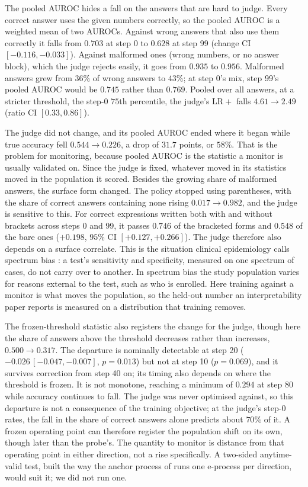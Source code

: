 \documentclass{article}
\begin{document}
The pooled AUROC hides a fall on the answers that are hard to judge. Every correct answer uses the given numbers correctly, so the pooled AUROC is a weighted mean of two AUROCs. Against wrong answers that also use them correctly it falls from $0.703$ at step 0 to $0.628$ at step 99 (change CI $[-0.116, -0.033]$). Against malformed ones (wrong numbers, or no answer block), which the judge rejects easily, it goes from $0.935$ to $0.956$. Malformed answers grew from $36\%$ of wrong answers to $43\%$; at step 0's mix, step 99's pooled AUROC would be $0.745$ rather than $0.769$. Pooled over all answers, at a stricter threshold, the step-0 $75$th percentile, the judge's $\mathrm{LR}+$ falls $4.61 \to 2.49$ (ratio CI $[0.33, 0.86]$).

The judge did not change, and its pooled AUROC ended where it began while true accuracy fell $0.544 \to 0.226$, a drop of $31.7$ points, or $58\%$. That is the problem for monitoring, because pooled AUROC is the statistic a monitor is usually validated on. Since the judge is fixed, whatever moved in its statistics moved in the population it scored. Besides the growing share of malformed answers, the surface form changed. The policy stopped using parentheses, with the share of correct answers containing none rising $0.017 \to 0.982$, and the judge is sensitive to this. For correct expressions written both with and without brackets across steps 0 and 99, it passes $0.746$ of the bracketed forms and $0.548$ of the bare ones ($+0.198$, $95\%$ CI $[+0.127, +0.266]$). The judge therefore also depends on a surface correlate. This is the situation clinical epidemiology calls spectrum bias \citep{ransohoff1978spectrum}: a test's sensitivity and specificity, measured on one spectrum of cases, do not carry over to another. In spectrum bias the study population varies for reasons external to the test, such as who is enrolled. Here training against a monitor is what moves the population, so the held-out number an interpretability paper reports is measured on a distribution that training removes.

The frozen-threshold statistic also registers the change for the judge, though here the share of answers above the threshold decreases rather than increases, $0.500 \to 0.317$. The departure is nominally detectable at step 20 ($-0.026\,[-0.047,-0.007]$, $p=0.013$) but not at step 10 ($p=0.069$), and it survives correction from step 40 on; its timing also depends on where the threshold is frozen. It is not monotone, reaching a minimum of $0.294$ at step 80 while accuracy continues to fall. The judge was never optimised against, so this departure is not a consequence of the training objective; at the judge's step-0 rates, the fall in the share of correct answers alone predicts about $70\%$ of it. A frozen operating point can therefore register the population shift on its own, though later than the probe's. The quantity to monitor is distance from that operating point in either direction, not a rise specifically. A two-sided anytime-valid test, built the way the anchor process of \citet{li2026whodrifted} runs one e-process per direction, would suit it; we did not run one.
\end{document}
